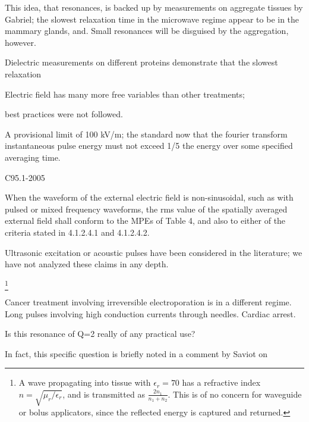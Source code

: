 \documentclass[paper.tex]{subfiles}
\begin{document}
\begin{multicols}{1}
This idea, that resonances, is backed up by measurements on aggregate tissues by Gabriel; the slowest relaxation time in the microwave regime appear to be in the mammary glands, and. Small resonances will be disguised by the aggregation, however.


Dielectric measurements on different proteins demonstrate that the slowest relaxation 








Electric field has many more free variables than other treatments; 



best practices were not followed.





A provisional limit of 100 kV/m; the standard now that the fourier transform instantaneous pulse energy must not exceed 1/5 the energy over some specified averaging time.

C95.1-2005


When the waveform of the external electric field is non-sinusoidal, such as with pulsed or mixed frequency
waveforms, the rms value of the spatially averaged external field shall conform to the MPEs of Table 4, and
also to either of the criteria stated in 4.1.2.4.1 and 4.1.2.4.2.

 
Ultrasonic excitation or acoustic pulses have been considered in the literature; we have not analyzed these claims in any depth.







\footnote{A wave propagating into tissue with $\epsilon_r=70$ has a refractive index $n=\sqrt{\mu_r/\epsilon_r}$, and is transmitted as $\frac{2 n_1}{n_1 + n_2}$. This is of no concern for waveguide or bolus applicators, since the reflected energy is captured and returned.}






Cancer treatment involving irreversible electroporation is in a different regime. Long pulses involving high conduction currents through needles. Cardiac arrest.




Is this resonance of Q=2 really of any practical use?


In fact, this specific question is briefly noted in a comment by Saviot \cite{Comment2004} on 



\end{multicols}
\end{document}

